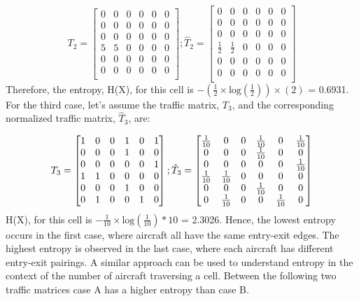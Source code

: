 \documentclass[conference, letter]{IEEEtran}
\begin{document}
$$
T_2 = \begin{bmatrix}
    0 & 0 & 0 & 0 & 0 & 0\\
    0 & 0 & 0 & 0 & 0 & 0\\
    0 & 0 & 0 & 0 & 0 & 0\\
    5 & 5 & 0 & 0 & 0 & 0\\
    0 & 0 & 0 & 0 & 0 & 0\\
    0 & 0 & 0 & 0 & 0 & 0\\
    \end{bmatrix}; 
\hat{T}_2 = \begin{bmatrix}
    0 & 0 & 0 & 0 & 0 & 0\\
    0 & 0 & 0 & 0 & 0 & 0\\
    0 & 0 & 0 & 0 & 0 & 0\\
    \frac{1}{2} & \frac{1}{2} & 0 & 0 & 0 & 0\\
    0 & 0 & 0 & 0 & 0 & 0\\
    0 & 0 & 0 & 0 & 0 & 0\\
    \end{bmatrix}
    $$
Therefore, the entropy, H(X), for this cell is $-(\frac{1}{2}\times \text{log}(\frac{1}{2}))\times(2)$ = 0.6931. For the third case, let's assume the traffic matrix, $T_3$, and the corresponding normalized traffic matrix, $\hat{T}_3$, are:

$$
T_3 = \begin{bmatrix}
    1 & 0 & 0 & 1 & 0 & 1\\
    0 & 0 & 0 & 1 & 0 & 0\\
    0 & 0 & 0 & 0 & 0 & 1\\
    1 & 1 & 0 & 0 & 0 & 0\\
    0 & 0 & 0 & 1 & 0 & 0\\
    0 & 1 & 0 & 0 & 1 & 0\\
    \end{bmatrix};
\hat{T}_3 = \begin{bmatrix}
    \frac{1}{10} & 0 & 0 & \frac{1}{10} & 0 & \frac{1}{10}\\
    0 & 0 & 0 & \frac{1}{10} & 0 & 0\\
    0 & 0 & 0 & 0 & 0 & \frac{1}{10}\\
    \frac{1}{10} & \frac{1}{10} & 0 & 0 & 0 & 0\\
    0 & 0 & 0 & \frac{1}{10} & 0 & 0\\
    0 & \frac{1}{10} & 0 & 0 & \frac{1}{10} & 0\\
    \end{bmatrix}
    \vspace{0.2cm}$$
H(X), for this cell is $-\frac{1}{10}\times \text{log}(\frac{1}{10})*10$ = 2.3026. Hence, the lowest entropy occurs in the first case, where aircraft all have the same entry-exit edges. The highest entropy is observed in the last case, where each aircraft has different entry-exit pairings. A similar approach can be used to understand entropy in the context of the number of aircraft traversing a cell. Between the following two traffic matrices case A has a higher entropy than case B.
\end{document}
